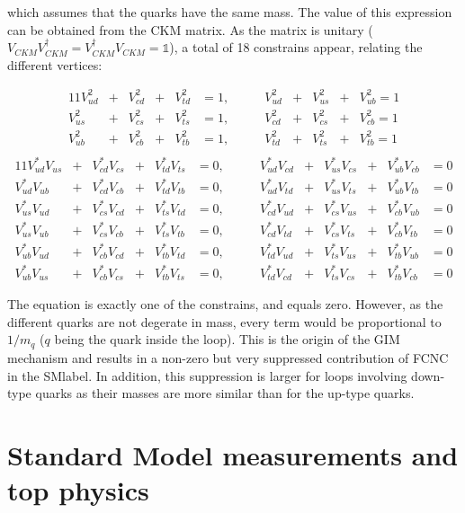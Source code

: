 which assumes that the quarks have the same mass. The value of this expression can be obtained from the CKM matrix. As the matrix is unitary ($V_{CKM}V_{CKM}^\dagger=V_{CKM}^\dagger V_{CKM}=\mathds{1}$), a total of 18 constrains appear, relating the different vertices: 

\begin{alignat*}{11}
    V_{ud}^2&+&V_{cd}^2&+&V_{td}^2&=1,   &\qquad V_{ud}^2&+&V_{us}^2&+&V_{ub}^2=1  \\
    V_{us}^2&+&V_{cs}^2&+&V_{ts}^2&=1,   &\qquad V_{cd}^2&+&V_{cs}^2&+&V_{cb}^2=1 \\
    V_{ub}^2&+&V_{cb}^2&+&V_{tb}^2&=1,   &\qquad V_{td}^2&+&V_{ts}^2&+&V_{tb}^2=1 \\
\end{alignat*}
\vspace{-1em}
\begin{alignat}{11}
    V_{ud}^*V_{us}&+&V_{cd}^*V_{cs}&+&V_{td}^*V_{ts}&=0,   &\qquad V_{ud}^*V_{cd}&+&V_{us}^*V_{cs}&+&V_{ub}^*V_{cb}&=0 \nonumber \\
    V_{ud}^*V_{ub}&+&V_{cd}^*V_{cb}&+&V_{td}^*V_{tb}&=0,   &\qquad V_{ud}^*V_{td}&+&V_{us}^*V_{ts}&+&V_{ub}^*V_{tb}&=0 \\ 
    V_{us}^*V_{ud}&+&V_{cs}^*V_{cd}&+&V_{ts}^*V_{td}&=0,   &\qquad V_{cd}^*V_{ud}&+&V_{cs}^*V_{us}&+&V_{cb}^*V_{ub}&=0 \nonumber\\
    V_{us}^*V_{ub}&+&V_{cs}^*V_{cb}&+&V_{ts}^*V_{tb}&=0,   &\qquad V_{cd}^*V_{td}&+&V_{cs}^*V_{ts}&+&V_{cb}^*V_{tb}&=0 \nonumber\\
    V_{ub}^*V_{ud}&+&V_{cb}^*V_{cd}&+&V_{tb}^*V_{td}&=0,   &\qquad V_{td}^*V_{ud}&+&V_{ts}^*V_{us}&+&V_{tb}^*V_{ub}&=0 \nonumber\\
    V_{ub}^*V_{us}&+&V_{cb}^*V_{cs}&+&V_{tb}^*V_{ts}&=0,   &\qquad V_{td}^*V_{cd}&+&V_{ts}^*V_{cs}&+&V_{tb}^*V_{cb}&=0 \nonumber
\end{alignat}

The equation is exactly one of the constrains, and equals zero.  However, as the different quarks are not degerate in mass, every term would be proportional to $1/m_q$ ($q$ being the quark inside the loop). This is the origin of the GIM mechanism and results in a non-zero but very suppressed contribution of FCNC in the \acrshort{SMlabel}. In addition, this suppression is larger for loops involving down-type quarks as their masses are more similar than for the up-type quarks.

\section{Standard Model measurements and top physics}

